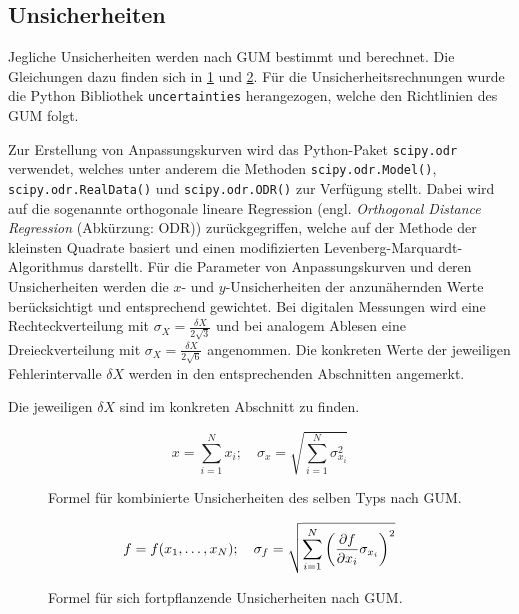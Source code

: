 \subsection{Unsicherheiten}\label{VGuD}

Jegliche Unsicherheiten werden nach GUM bestimmt und berechnet.
Die Gleichungen dazu finden sich in \cref{fig:GUM_combine} und \cref{fig:GUM_formula}.
Für die Unsicherheitsrechnungen wurde die Python Bibliothek \texttt{uncertainties} herangezogen, welche den Richtlinien des GUM folgt.

Zur Erstellung von Anpassungskurven wird das Python-Paket \texttt{scipy.odr} verwendet, welches unter anderem die Methoden \texttt{scipy.odr.Model()}, \texttt{scipy.odr.RealData()} und \texttt{scipy.odr.ODR()} zur Verfügung stellt.
Dabei wird auf die sogenannte orthogonale lineare Regression (engl. \emph{Orthogonal Distance Regression} (Abkürzung: ODR)) zurückgegriffen, welche auf der Methode der kleinsten Quadrate basiert und einen modifizierten Levenberg-Marquardt-Algorithmus darstellt.
Für die Parameter von Anpassungskurven und deren Unsicherheiten werden die $x$- und $y$-Unsicherheiten der anzunähernden Werte berücksichtigt und entsprechend gewichtet.
Bei digitalen Messungen wird eine Rechteckverteilung mit $\sigma_X = \frac{\delta X}{2\sqrt{3}}$ und bei analogem Ablesen eine Dreieckverteilung mit $\sigma_X = \frac{\delta X}{2\sqrt{6}}$ angenommen.
Die konkreten Werte der jeweiligen Fehlerintervalle $\delta X$ werden in den entsprechenden Abschnitten angemerkt.

Die jeweiligen $\delta X$ sind im konkreten Abschnitt zu finden.

\begin{figure}[H]
	\begin{equation*}
		x = \sum_{i=1}^{N} x_i
		;\quad
		\sigma_x = \sqrt{\sum_{i = 1}^{N} \sigma_{x_i}^2}
	\end{equation*}
	\caption{Formel für kombinierte Unsicherheiten des selben Typs nach GUM.}
	\label{fig:GUM_combine}
\end{figure}

\begin{figure}[H]
	\begin{align*}
		f = f(x_1, \dots , x_N)
		;\quad
		\sigma_f = \sqrt{\sum_{i = 1}^{N}\left(\pdv{f}{x_i} \sigma_{x_i}\right) ^2}
	\end{align*}
	\caption{Formel für sich fortpflanzende Unsicherheiten nach GUM.}
	\label{fig:GUM_formula}
\end{figure}

